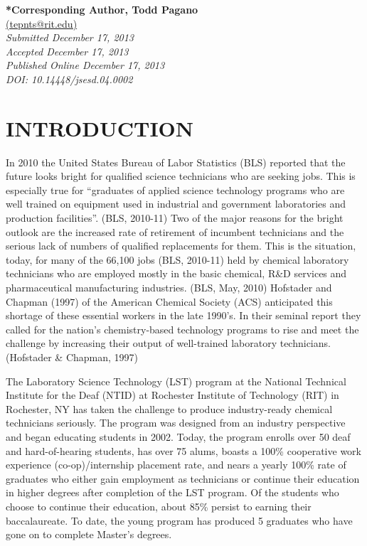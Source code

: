 \documentclass[11.5pt]{sig-alternate} %
\begin{document}
\textbf{*Corresponding Author, Todd Pagano}\\
\href{mailto:tepnts@rit.edu}{(tepnts@rit.edu)}\\
\textit{Submitted December 17, 2013}\\
\textit{Accepted December 17, 2013}\\
\textit{Published Online December 17, 2013}\\
\textit{DOI: 10.14448/jsesd.04.0002}\\

\pagebreak
\clearpage
\section*{INTRODUCTION}
\begin{large}
In 2010 the United States Bureau of Labor Statistics (BLS) reported that the future looks bright for qualified science technicians who are seeking jobs. This is especially true for “graduates of applied science technology programs who are well trained on equipment used in industrial and government laboratories and production facilities”. (BLS, 2010-11) Two of the major reasons for the bright outlook are the increased rate of retirement of incumbent technicians and the serious lack of numbers of qualified replacements for them. This is the situation, today, for many of the 66,100 jobs (BLS, 2010-11) held by chemical laboratory technicians who are employed mostly in the basic chemical, R\&D services and pharmaceutical manufacturing industries. (BLS, May, 2010) Hofstader and Chapman (1997) of the American Chemical Society (ACS) anticipated this shortage of these essential workers in the late 1990’s. In their seminal report they called for the nation’s chemistry-based technology programs to rise and meet the challenge by increasing their output of well-trained laboratory technicians.(Hofstader \& Chapman, 1997)

The Laboratory Science Technology (LST) program at the National Technical Institute for the Deaf (NTID) at Rochester Institute of Technology (RIT) in Rochester, NY has taken the challenge to produce industry-ready chemical technicians seriously. The program was designed from an industry perspective and began educating students in 2002. Today, the program enrolls over 50 deaf and hard-of-hearing students, has over 75 alums, boasts a 100\% cooperative work experience (co-op)/internship placement rate, and nears a yearly 100\% rate of graduates who either gain employment as technicians or continue their education in higher degrees after completion of the LST program. Of the students who choose to continue their education, about 85\% persist to earning their baccalaureate. To date, the young program has produced 5 graduates who have gone on to complete Master’s degrees.


\end{large}
\end{document}
